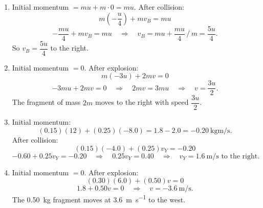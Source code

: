 \documentclass[11pt,a4paper]{article}
\begin{document}
\begin{enumerate}
    \item Initial momentum $= mu + m\cdot 0 = mu$. After collision:
    \[
        m\left(-\frac{u}{4}\right) + m v_B = mu
    \]
    \[
        -\frac{mu}{4} + m v_B = mu \quad\Rightarrow\quad v_B = mu + \frac{mu}{4}\,\bigg/\,m = \frac{5u}{4}.
    \]
    So $v_B = \dfrac{5u}{4}$ to the right.

    \item Initial momentum $= 0$. After explosion:
    \[
        m(-3u) + 2m v = 0
    \]
    \[
        -3mu + 2m v = 0 \quad\Rightarrow\quad 2m v = 3mu \quad\Rightarrow\quad v = \frac{3u}{2}.
    \]
    The fragment of mass $2m$ moves to the right with speed $\dfrac{3u}{2}$.

    \item Initial momentum:
    \[
        (0.15)(12) + (0.25)(-8.0) = 1.8 - 2.0 = -\SI{0.20}{\kilogram\meter\per\second}.
    \]
    After collision:
    \[
        (0.15)(-4.0) + (0.25)v_Y = -0.20
    \]
    \[
        -0.60 + 0.25 v_Y = -0.20 \quad\Rightarrow\quad 0.25 v_Y = 0.40 \quad\Rightarrow\quad v_Y = \SI{1.6}{\meter\per\second} \text{ to the right.}
    \]

    \item Initial momentum $= 0$. After explosion:
    \[
        (0.30)(6.0) + (0.50) v = 0
    \]
    \[
        1.8 + 0.50 v = 0 \quad\Rightarrow\quad v = \SI{-3.6}{\meter\per\second}.
    \]
    The \SI{0.50}{\kilogram} fragment moves at \SI{3.6}{\meter\per\second} to the west.
\end{enumerate}
\end{document}
